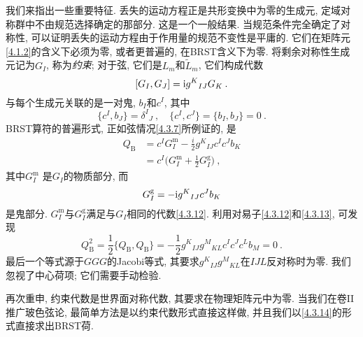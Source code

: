 我们来指出一些重要特征. 丢失的运动方程正是共形变换中为零的生成元, 定域对称群中不由规范选择确定的那部分. 这是一个一般结果. 当规范条件完全确定了对称性, 可以证明丢失的运动方程由于作用量的规范不变性是平庸的. 它们在矩阵元\eqref{4.1.2}的含义下必须为零, 或者更普遍的, 在BRST含义下为零. 将剩余对称性生成元记为$G_{I}$, 称为\emph{约束}; 对于弦, 
它们是$L_{m}$和$\tilde{L}_{m}$, 它们构成代数
\begin{equation}\label{4.3.12}
[G_{I}, G_{J}]=\mathrm{i} g^{K}{}_{I J} G_{K} \:. 
\end{equation}
与每个生成元关联的是一对鬼, $b_{I}$和$c^{I}$, 其中
\begin{equation}\label{4.3.13}
\{c^{I}, b_{J} \}=\delta^{I}{}_{J}\:, \quad \{c^{I}, c^{J}\}=\{b_{I}, b_{J}\}=0 \:.
\end{equation}
BRST算符的普遍形式, 正如弦情况\eqref{4.3.7}所例证的, 是
\begin{equation}\label{4.3.14}
\begin{aligned}
Q_{\mathrm{B}} &=c^{I} G_{I}^{\mathrm{m}}-\frac{i}{2} g^{K}{ }_{I J} c^{I} c^{J} b_{K} \\
&=c^{I}\biggl(G_{I}^{\mathrm{m}}+\frac{1}{2} G_{I}^{\mathrm{g}}\biggr) \:,
\end{aligned}
\end{equation}
其中$G_{I}^{\mathrm{m}}$ 是$G_{I}$的物质部分, 而
\begin{equation}
G_{I}^{\mathrm{g}}=-\mathrm{i} g^{K}{}_{I J} c^{J} b_{K} \label{4.3.15}
\end{equation}
是鬼部分. $G_{I}^{\mathrm{m}}$与$G_{I}^{\mathrm{g}}$满足与$G_{I}$相同的代数\eqref{4.3.12}. 利用对易子\eqref{4.3.12}和\eqref{4.3.13}, 可发现
\begin{equation}
Q_{\mathrm{B}}^{2}=\frac{1}{2} \{Q_{\mathrm{B}}, Q_{\mathrm{B}}\}=-\frac{1}{2} g^{K}{}_{I J} g^{M}{}_{K L} c^{I} c^{J} c^{L} b_{M}=0 \:. \label{4.3.16}
\end{equation}
最后一个等式源于$GGG$的Jacobi等式, 其要求$g^{K}{}_{I J} g^{M}{}_{K L}$在$IJL$反对称时为零. 我们忽视了中心荷项; 它们需要手动检验.

再次重申, 约束代数是世界面对称代数, 其要求在物理矩阵元中为零. 当我们在卷II推广玻色弦论, 最简单方法是以约束代数形式直接这样做, 并且我们以\eqref{4.3.14}的形式直接求出BRST荷.

